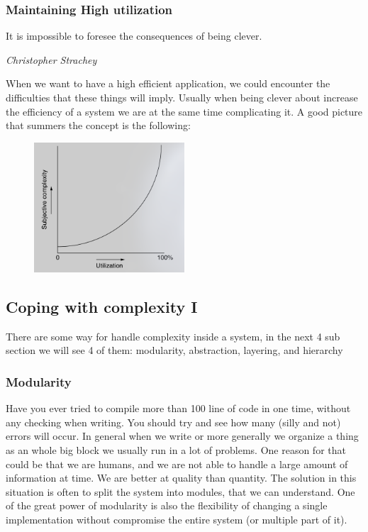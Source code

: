 \documentclass{article}
\begin{document}
    \subsubsection{Maintaining High utilization}
      \epigraph{It is impossible to foresee the consequences of being clever.}{\textit{Christopher Strachey}}
      When we want to have a high efficient application, we could encounter the difficulties
      that these things will imply. Usually when being clever about increase the efficiency of
      a system we are at the same time complicating it. A good picture that summers the concept
      is the following: 
      \begin{figure}[h]
        \centering
        \includegraphics[width=0.50\textwidth]{utilization-graph}
        \caption{}
        \label{fig:mesh2}
      \end{figure}
  \subsection{Coping with complexity I}
  There are some way for handle complexity inside a system, in the next 4 sub section we will
  see 4 of them: modularity, abstraction, layering, and hierarchy
  \subsubsection{Modularity}
    Have you ever tried to compile more than 100 line of code in one time, without 
    any checking when writing. You should try and see how many (silly and not) errors will 
    occur. In general when we write or more generally we organize a thing as an whole big block
    we usually run in a lot of problems. One reason for that could be that we are humans, and 
    we are not able to handle a large amount of information at time. We are better at quality 
    than quantity. The solution in this situation is often to split the system into modules, 
    that we can understand. One of the great power of modularity is also the flexibility of
    changing a single implementation without compromise the entire system (or multiple part
    of it).
\end{document}
